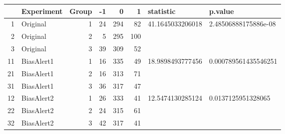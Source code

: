 \begin{table}[ht]
\centering
\begin{tabular}{rlrrrrll}
  \hline
 & Experiment & Group & -1 & 0 & 1 & statistic & p.value \\ 
  \hline
1 & Original &   1 &  24 & 294 &  82 & 41.1645033206018 & 2.48506888175886e-08 \\ 
  2 & Original &   2 &   5 & 295 & 100 &   &   \\ 
  3 & Original &   3 &  39 & 309 &  52 &   &   \\ 
  11 & BiasAlert1 &   1 &  16 & 335 &  49 & 18.9898493777456 & 0.000789561435546251 \\ 
  21 & BiasAlert1 &   2 &  16 & 313 &  71 &   &   \\ 
  31 & BiasAlert1 &   3 &  36 & 317 &  47 &   &   \\ 
  12 & BiasAlert2 &   1 &  26 & 333 &  41 & 12.5474130285124 & 0.0137125951328065 \\ 
  22 & BiasAlert2 &   2 &  24 & 315 &  61 &   &   \\ 
  32 & BiasAlert2 &   3 &  42 & 317 &  41 &   &   \\ 
   \hline
\end{tabular}
\end{table}
